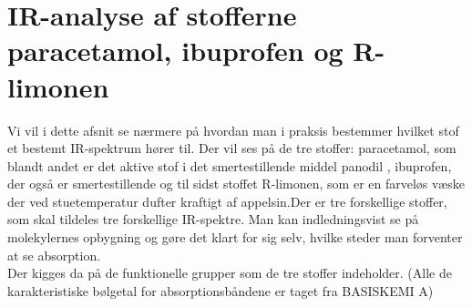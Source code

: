 \section{IR-analyse af stofferne paracetamol, ibuprofen og R-limonen}\label{IRSPEK}
Vi vil i dette afsnit se nærmere på hvordan man i praksis bestemmer hvilket stof et bestemt IR-spektrum hører til. Der vil ses på de tre stoffer: paracetamol, som blandt andet er det aktive stof i det smertestillende middel panodil , ibuprofen, der også er smertestillende og til sidst stoffet R-limonen, som er en farveløs væske der ved stuetemperatur dufter kraftigt af appelsin. Der er tre forskellige stoffer, som skal tildeles tre forskellige IR-spektre. Man kan indledningsvist se på molekylernes opbygning og gøre det klart for sig selv, hvilke steder man forventer at se absorption. 
\\

Der kigges da på de funktionelle grupper som de tre stoffer indeholder. (Alle de karakteristiske bølgetal for absorptionsbåndene er taget fra BASISKEMI A)

